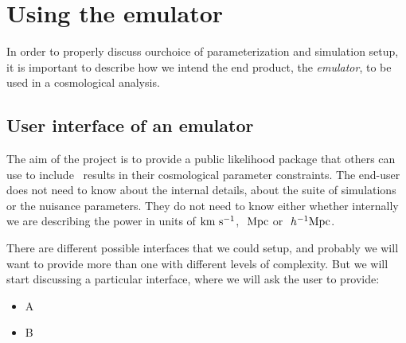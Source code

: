 \section{Using the emulator}

In order to properly discuss ourchoice of parameterization and simulation
setup, it is important to describe how we intend the end product,
the \textit{emulator}, to be used in a cosmological analysis.


\subsection{User interface of an emulator}

The aim of the project is to provide a public likelihood package that others
can use to include \lya\ results in their cosmological parameter constraints.
The end-user does not need to know about the internal details, about the 
suite of simulations or the nuisance parameters.
They do not need to know either whether internally we are describing the 
power in units of ${\rm km~s^{-1}}$, $\ \text{Mpc}$ or $\ h^{-1}\text{Mpc}$. 

There are different possible interfaces that we could setup, and probably 
we will want to provide more than one with different levels of complexity.
But we will start discussing a particular interface, where we will ask 
the user to provide:
\begin{itemize}
 \item A
 \item B
\end{itemize}




